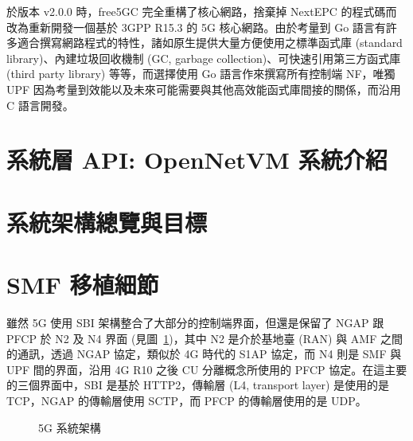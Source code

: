 於版本 v2.0.0 時，free5GC 完全重構了核心網路，捨棄掉 NextEPC 的程式碼而改為重新開發一個基於 3GPP R15.3 的 5G 核心網路。由於考量到 Go 語言有許多適合撰寫網路程式的特性，諸如原生提供大量方便使用之標準函式庫 (standard library)、內建垃圾回收機制 (GC, garbage collection)、可快速引用第三方函式庫 (third party library) 等等，而選擇使用 Go 語言作來撰寫所有控制端 NF，唯獨 UPF 因為考量到效能以及未來可能需要與其他高效能函式庫間接的關係，而沿用 C 語言開發。

\section{系統層 API: OpenNetVM 系統介紹}
\label{sec:opennetvm_intro}

\section{系統架構總覽與目標}
\label{sec:arch_intro}

\section{SMF 移植細節}
\label{sec:smf_porting}

雖然 5G 使用 SBI 架構整合了大部分的控制端界面，但還是保留了 NGAP 跟 PFCP 於 N2 及 N4 界面 (見圖~\ref{fig:5g_system_architecture})，其中 N2 是介於基地臺 (RAN) 與 AMF 之間的通訊，透過 NGAP 協定，類似於 4G 時代的 S1AP 協定，而 N4 則是 SMF 與 UPF 間的界面，沿用 4G R10 之後 CU 分離概念所使用的 PFCP 協定。在這主要的三個界面中，SBI 是基於 HTTP2，傳輸層 (L4, transport layer) 是使用的是 TCP，NGAP 的傳輸層使用 SCTP，而 PFCP 的傳輸層使用的是 UDP。

\begin{figure}[ht]
  \centering
  \caption[5G 系統架構]{{\footnotesize 5G 系統架構~\cite{3gpp.23.501}}}
  \label{fig:5g_system_architecture}
\end{figure}

